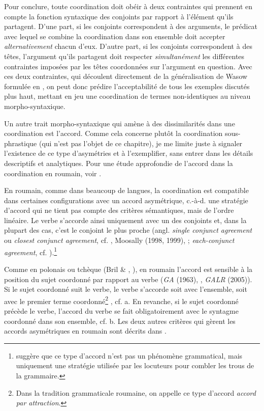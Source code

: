 Pour conclure, toute coordination doit obéir à deux contraintes qui prennent en compte la fonction syntaxique des conjoints par rapport à l'élément qu'ils partagent. D'une part, si les conjoints correspondent à des arguments, le prédicat avec lequel se combine la coordination dans son ensemble doit accepter \textit{alternativement} chacun d'eux. D'autre part, si les conjoints correspondent à des têtes, l'argument qu'ils partagent doit respecter \textit{simultanément} les différentes contraintes imposées par les têtes coordonnées sur l'argument en question. Avec ces deux contraintes, qui découlent directement de la généralisation de Wasow formulée en , on peut donc prédire l'acceptabilité de tous les exemples discutés plus haut, mettant en jeu une coordination de termes non-identiques au niveau morpho-syntaxique.

Un autre trait morpho-syntaxique qui amène à des dissimilarités dans une coordination est l'accord. Comme cela concerne plutôt la coordination sous-phrastique (qui n'est pas l'objet de ce chapitre), je me limite juste à signaler l'existence de ce type d'asymétries et à l'exemplifier, sans entrer dans les détails descriptifs et analytiques. Pour une étude approfondie de l'accord dans la coordination en roumain, voir \citet{Croitor2011}.

En roumain, comme dans beaucoup de langues, la coordination est compatible dans certaines configurations avec un accord asymétrique, c.-à-d. une stratégie d'accord qui ne tient pas compte des critères sémantiques, mais de l'ordre linéaire. Le verbe s'accorde ainsi uniquement avec un des conjoints et, dans la plupart des cas, c'est le conjoint le plus proche (angl. \textit{single conjunct agreement} ou \textit{closest conjunct agreement}, cf. \citet{Corbett1991}, Moosally (1998, 1999), \citet{Sadler2003} ; \textit{each-conjunct agreement}, cf. \citet{Yatabe2004}).\footnote{\citet{Peterson2004a} suggère que ce type d'accord n'est pas un phénomène grammatical, mais uniquement une stratégie utilisée par les locuteurs pour combler les trous de la grammaire.} 

Comme en polonais ou tchèque (Bril \& \citet{Rebuschi2006}, \citet{Borsley2009}), en roumain l'accord est sensible à la position du sujet coordonné par rapport au verbe (\textit{GA} (1963), \citet{Avram2001}, \textit{GALR} (2005)). Si le sujet coordonné suit le verbe, le verbe s'accorde soit avec l'ensemble, soit avec le premier terme coordonné\footnote{Dans la tradition grammaticale roumaine, on appelle ce type d'accord \textit{accord par attraction}.} , cf. a. En revanche, si le sujet coordonné précède le verbe, l'accord du verbe se fait obligatoirement avec le syntagme coordonné dans son ensemble, cf. b. Les deux autres critères qui gèrent les accords asymétriques en roumain sont décrits dans \citet{Croitor2011}. 


